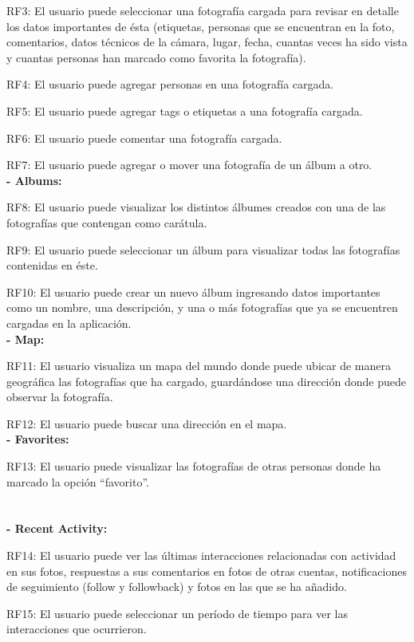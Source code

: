\documentclass{memoria}
\begin{document}
RF3: El usuario puede seleccionar una fotografía cargada para revisar en detalle los datos importantes de ésta (etiquetas, personas que se encuentran en la foto, comentarios, datos técnicos de la cámara, lugar, fecha, cuantas veces ha sido vista y cuantas personas han marcado como favorita la fotografía).

RF4: El usuario puede agregar personas en una fotografía cargada.

RF5: El usuario puede agregar tags o etiquetas a una fotografía cargada.

RF6: El usuario puede comentar una fotografía cargada.

RF7: El usuario puede agregar o mover una fotografía de un álbum a otro.\\

\textbf{- Albums:}

RF8: El usuario puede visualizar los distintos álbumes creados con una de las fotografías que contengan como carátula.

RF9: El usuario puede seleccionar un álbum para visualizar todas las fotografías contenidas en éste.

RF10: El usuario puede crear un nuevo álbum ingresando datos importantes como un nombre, una descripción, y una o más fotografías que ya se encuentren cargadas en la aplicación. \\

\textbf{- Map:}

RF11: El usuario visualiza un mapa del mundo donde puede ubicar de manera geográfica las fotografías que ha cargado, guardándose una dirección donde puede observar la fotografía. 

RF12: El usuario puede buscar una dirección en el mapa. \\

\textbf{- Favorites:}

RF13: El usuario puede visualizar las fotografías de otras personas donde ha marcado la opción “favorito”.\\\\\\

\textbf{- Recent Activity:}

RF14: El usuario puede ver las últimas interacciones relacionadas con actividad en sus fotos, respuestas a sus comentarios en fotos de otras cuentas, notificaciones de seguimiento (follow y followback) y fotos en las que se ha añadido.

RF15: El usuario puede seleccionar un período de tiempo para ver las interacciones que ocurrieron.\\
\end{document}
